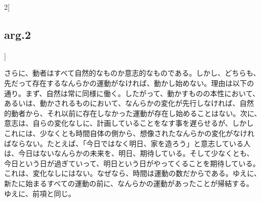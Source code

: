 \documentclass[paper=a4paper,fontsize=10pt,jafontsize=9pt,titlepage]{jlreq}
\begin{document}
\begin{paracol}{2}[\subsection{arg.2}]
\switchcolumn


さらに、動者はすべて自然的なものか意志的なものである。しかし、どちらも、
先だって存在するなんらかの運動がなければ、動かし始めない。理由は以下の
通り。まず、自然は常に同様に働く。したがって、動かすものの本性において、
あるいは、動かされるものにおいて、なんらかの変化が先行しなければ、自然
的動者から、それ以前に存在しなかった運動が存在し始めることはない。次に、
意志は、自らの変化なしに、計画していることをなす事を遅らせるが、しかし
これには、少なくとも時間自体の側から、想像されたなんらかの変化がなけれ
ばならない。たとえば、「今日ではなく明日、家を造ろう」と意志している人
は、今日はないなんらかの未来を、明日、期待している。そして少なくとも、
今日という日が過ぎていって、明日という日がやってくることを期待している。
これは、変化なしにはない。なぜなら、時間は運動の数だからである。ゆえに、
新たに始まるすべての運動の前に、なんらかの運動があったことが帰結する。
ゆえに、前項と同じ。


\switchcolumn*



\end{paracol}
%
%
%
\end{document}
